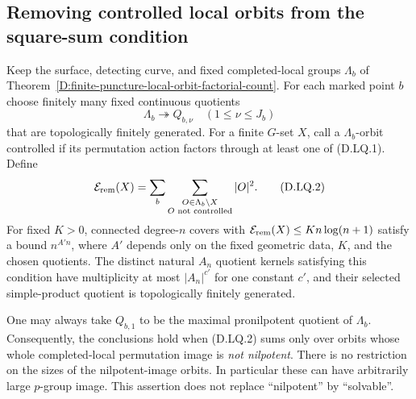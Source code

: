 \subsection{Removing controlled local orbits from the square-sum condition}

\begin{corollary}
\label{D:fixed-local-quotient-alternating-count}
Keep the surface, detecting curve, and fixed completed-local groups
$\Lambda_b$ of Theorem~\ref{D:finite-puncture-local-orbit-factorial-count}.
For each marked point $b$ choose finitely many fixed continuous
quotients
\[
             \Lambda_b\twoheadrightarrow Q_{b,\nu}
                          \quad(1\le\nu\le J_b)
                                                               \tag{D.LQ.1}
\]
that are topologically finitely generated. For a finite $G$-set $X$,
call a $\Lambda_b$-orbit controlled if its permutation action factors
through at least one of (D.LQ.1). Define
\[
 \mathcal E_{\rm rem}(X)=
       \sum_b\sum_{\substack{O\in\Lambda_b\backslash X\\
                              O\text{ not controlled}}}|O|^2.
                                                               \tag{D.LQ.2}
\]
For fixed $K>0$, connected degree-$n$ covers with
$\mathcal E_{\rm rem}(X)\le K n\log(n+1)$ satisfy a bound
$n^{A'n}$, where $A'$ depends only on the fixed geometric data,
$K$, and the chosen quotients. The distinct natural $A_n$ quotient
kernels satisfying this condition have multiplicity at most
$|A_n|^{c'}$ for one constant $c'$, and their selected
simple-product quotient is topologically finitely generated.

One may always take $Q_{b,1}$ to be the maximal pronilpotent
quotient of $\Lambda_b$. Consequently, the conclusions hold when
(D.LQ.2) sums only over orbits whose whole completed-local
permutation image is \emph{not nilpotent}. There is no restriction
on the sizes of the nilpotent-image orbits. In particular these
can have arbitrarily large $p$-group image. This assertion does
not replace ``nilpotent'' by ``solvable''.
\end{corollary}


